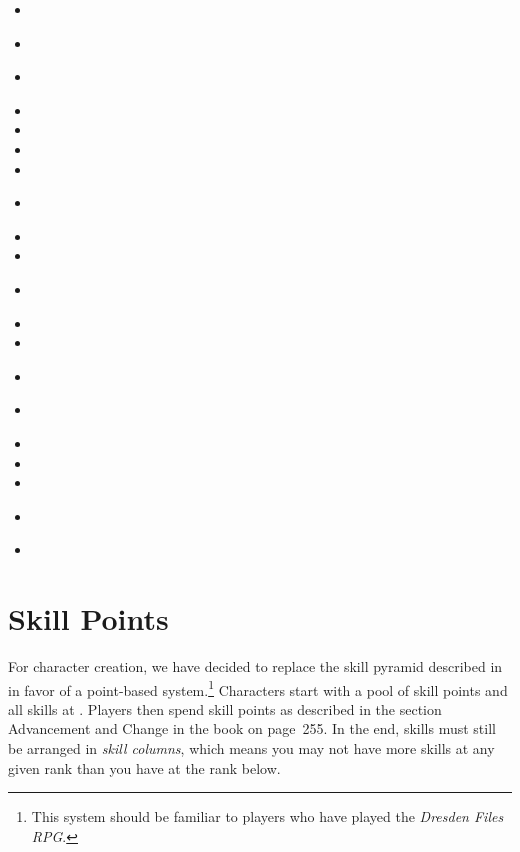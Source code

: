 \documentclass[12pt,titlepage,openany]{book}
\begin{document}
\begin{multicols}{3}
    \raggedcolumns
    \begin{itemize}
        \item \textbf{}
        \item {}
        \item \textbf{}
        \item {}
        \item {}
        \item {}
        \item {}
        \item \textbf{}
        \item {}
        \item {}
        \item \textbf{}
        \item {}
        \item {}
        \item \textbf{}
        \item \textbf{}
        \item {}
        \item {}
        \item {}
        \item \textbf{}
        \item {}
    \end{itemize}
\end{multicols}

\section{Skill Points}\label{sec:skill-points}

For character creation, we have decided to replace the skill pyramid described
in \FateCore{} in favor of a point-based system.\footnote{This system should be
familiar to players who have played the \textit{Dresden Files RPG}.} Characters
start with a pool of skill points and all skills at . Players then
spend skill points as described in the section Advancement and Change in the
\FateCore{} book on page~255. In the end, skills must still be arranged in
\emph{skill columns}, which means you may not have more skills at any given
rank than you have at the rank below.
\end{document}

